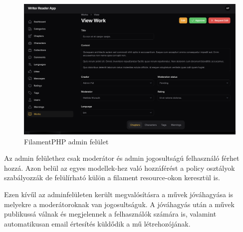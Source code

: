 \begin{figure}[H]
    \centering
    \includegraphics[scale=0.25]{./figures/admin-panel.png}
    \caption{FilamentPHP admin felület}
    \label{fig:admin}
\end{figure}

Az admin felülethez csak moderátor és admin jogosultságú felhasználó férhet hozzá. Azon belül az egyes modellek-hez való hozzáférést a policy osztályok szabályozzák de felülírható külön a filament resource-okon keresztül is.

Ezen kívűl az adminfelületen került megvalósításra a művek jóváhagyása is melyekre a moderátoroknak van jogosultságuk. A jóváhagyás után a művek publikussá válnak és megjelennek a felhasználók számára is, valamint automatikusan email értesítés küldődik a mű létrehozójának.
